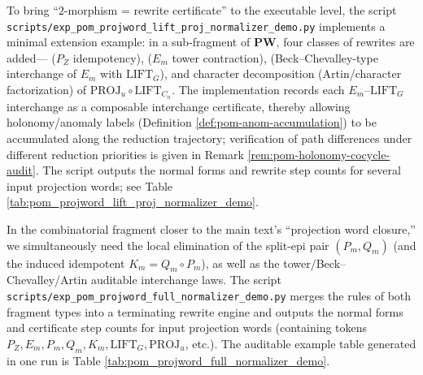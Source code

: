 \begin{remark}\label{rem:pom-projword-lift-proj-normalizer-demo}
To bring ``\(2\)-morphism = rewrite certificate'' to the executable level, the script \texttt{scripts/exp\_pom\_projword\_lift\_proj\_normalizer\_demo.py} implements a minimal extension example:
in a sub-fragment of \(\mathbf{PW}\), four classes of rewrites are added---
(\(P_Z\) idempotency), (\(E_m\) tower contraction), (Beck--Chevalley-type interchange of \(E_m\) with \(\mathrm{LIFT}_G\)), and character decomposition (Artin/character factorization) of \(\mathrm{PROJ}_u\circ \mathrm{LIFT}_{C_n}\).
The implementation records each \(E_m\)--\(\mathrm{LIFT}_G\) interchange as a composable interchange certificate, thereby allowing holonomy/anomaly labels (Definition \ref{def:pom-anom-accumulation}) to be accumulated along the reduction trajectory; verification of path differences under different reduction priorities is given in Remark \ref{rem:pom-holonomy-cocycle-audit}.
The script outputs the normal forms and rewrite step counts for several input projection words; see Table \ref{tab:pom_projword_lift_proj_normalizer_demo}.

\end{remark}

\begin{remark}\label{rem:pom-projword-full-normalizer-demo}
In the combinatorial fragment closer to the main text's ``projection word closure,'' we simultaneously need the local elimination of the split-epi pair \((P_m,Q_m)\) (and the induced idempotent \(K_m=Q_m\circ P_m\)),
as well as the tower/Beck--Chevalley/Artin auditable interchange laws.
The script \texttt{scripts/exp\_pom\_projword\_full\_normalizer\_demo.py} merges the rules of both fragment types into a terminating rewrite engine and outputs the normal forms and certificate step counts for input projection words (containing tokens \(P_Z,E_m,P_m,Q_m,K_m,\mathrm{LIFT}_G,\mathrm{PROJ}_u\), etc.).
The auditable example table generated in one run is Table \ref{tab:pom_projword_full_normalizer_demo}.

\end{remark}

